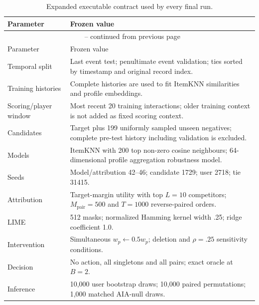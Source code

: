 \begin{longtable}{@{}p{}p{}@{}}
\caption{Expanded executable contract used by every final run.}\label{tab:S5}\\
\toprule
Parameter & Frozen value \\
\midrule
\endfirsthead
\multicolumn{2}{c}{\tablename\ \thetable{} -- continued from previous page}\\
\toprule
Parameter & Frozen value \\
\midrule
\endhead
\bottomrule
\endfoot
\bottomrule
\endlastfoot
Temporal split & Last event test; penultimate event validation; ties sorted by timestamp and original record index. \\
Training histories & Complete histories are used to fit ItemKNN similarities and profile embeddings. \\
Scoring/player window & Most recent 20 training interactions; older training context is not added as fixed scoring context. \\
Candidates & Target plus 199 uniformly sampled unseen negatives; complete pre-test history including validation is excluded. \\
Models & ItemKNN with 200 top non-zero cosine neighbours; 64-dimensional profile aggregation robustness model. \\
Seeds & Model/attribution 42--46; candidate 1729; user 2718; tie 31415. \\
Attribution & Target-margin utility with top $L=10$ competitors; $M_{\mathrm{pair}}=500$ and $T=1000$ reverse-paired orders. \\
LIME & 512 masks; normalized Hamming kernel width .25; ridge coefficient 1.0. \\
Intervention & Simultaneous $w_p\leftarrow0.5w_p$; deletion and $\rho=.25$ sensitivity conditions. \\
Decision & No action, all singletons and all pairs; exact oracle at $B=2$. \\
Inference & 10,000 user bootstrap draws; 10,000 paired permutations; 1,000 matched AIA-null draws. \\
\end{longtable}
